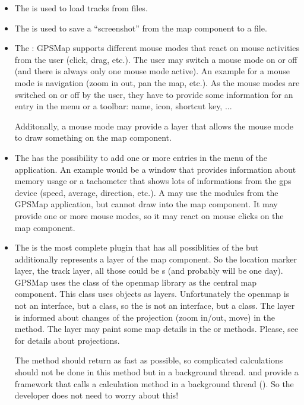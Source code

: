 \documentclass[a4paper]{article} %
\begin{document}
\begin{itemize}

\item The  is used to load tracks from
files.

\item The  is used to save a
``screenshot'' from the map component to a file.

\item The : GPSMap supports different
mouse modes that react on mouse activities from the user (click, drag,
etc.). The user may switch a mouse mode on or off (and there is always
only one mouse mode active). An example for a mouse mode is navigation
(zoom in out, pan the map, etc.). As the mouse modes are switched on
or off by the user, they have to provide some information for an entry
in the menu or a toolbar: name, icon, shortcut key, ...

Additonally, a mouse mode may provide a layer that allows the mouse
mode to draw something on the map component.
 
\item The  has the possibility to add one or
more entries in the menu of the application. An example would be a
window that provides information about memory usage or a tachometer
that shows lots of informations from the gps device (speed, average,
direction, etc.). A  may use the modules from
the GPSMap application, but cannot draw into the map component. It may
provide one or more mouse modes, so it may react on mouse clicks on
the map component.

\item The  is the most complete plugin that has
all possiblities of the  but additionally
represents a layer of the map component. So the location marker layer,
the track layer, all those could be s (and
probably will be one day). GPSMap uses the  class
of the openmap library as the central map component. This class uses
 objects as layers. Unfortunately the openmap
 is not an interface, but a class, so the
 is not an interface, but a class. The layer is
informed about changes of the projection (zoom in/out, move) in the
method. The layer may paint some map details in the
 or
 methods. Please, see
 for details
about projections.

The  method should return as fast as possible, so
complicated calculations should not be done in this method but in a
background thread. 
and  provide
a framework that calls a calculation method in a background thread
(). So the developer does not need to worry
about this!

\end{itemize}
\end{document}
